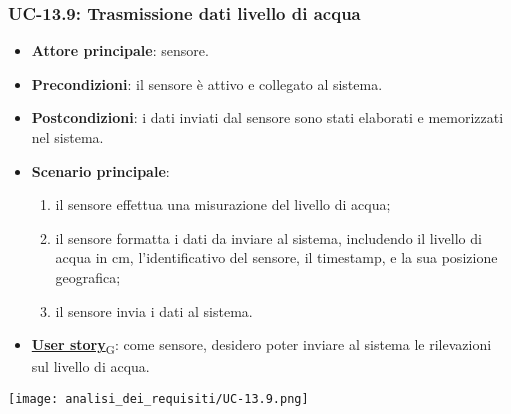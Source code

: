 \subsubsection{UC-13.9: Trasmissione dati livello di acqua}
\begin{itemize}
	\item \textbf{Attore principale}: sensore.
	\item \textbf{Precondizioni}: il sensore è attivo e collegato al sistema.
	\item \textbf{Postcondizioni}: i dati inviati dal sensore sono stati elaborati e memorizzati nel sistema.
	\item \textbf{Scenario principale}:
	      \begin{enumerate}
		      \item il sensore effettua una misurazione del livello di acqua;
		      \item il sensore formatta i dati da inviare al sistema, includendo il livello di acqua in cm, l'identificativo del sensore,
		            il timestamp, e la sua posizione geografica;
		      \item il sensore invia i dati al sistema.
	      \end{enumerate}
	\item \href{https://7last.github.io/docs/rtb/documentazione-interna/glossario\#user-story}{\textbf{User story}\textsubscript{G}}: come sensore, desidero poter inviare al sistema le rilevazioni sul livello di acqua.
\end{itemize}

\begin{center}
	\texttt{[image: analisi\_dei\_requisiti/UC-13.9.png]}
\end{center}

